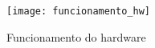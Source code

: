 \begin{figure}
	\centering
	\texttt{[image: funcionamento\_hw]}
	\caption{Funcionamento do hardware}
	\label{fig:func_hw}
\end{figure}







